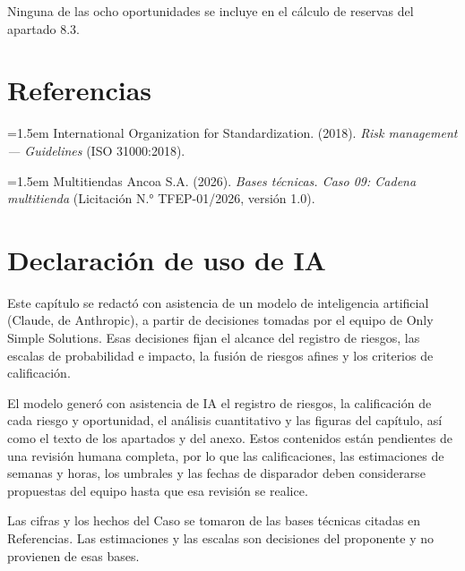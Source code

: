 \documentclass[11pt]{article}
\begin{document}
Ninguna de las ocho oportunidades se incluye en el cálculo de reservas del apartado 8.3.

\section*{Referencias}

\noindent\hangindent=1.5em International Organization for Standardization. (2018). \textit{Risk management — Guidelines} (ISO 31000:2018).

\noindent\hangindent=1.5em Multitiendas Ancoa S.A. (2026). \textit{Bases técnicas. Caso 09: Cadena multitienda} (Licitación N.° TFEP-01/2026, versión 1.0).

\section*{Declaración de uso de IA}

Este capítulo se redactó con asistencia de un modelo de inteligencia artificial (Claude, de Anthropic), a partir de decisiones tomadas por el equipo de Only Simple Solutions. Esas decisiones fijan el alcance del registro de riesgos, las escalas de probabilidad e impacto, la fusión de riesgos afines y los criterios de calificación.

El modelo generó con asistencia de IA el registro de riesgos, la calificación de cada riesgo y oportunidad, el análisis cuantitativo y las figuras del capítulo, así como el texto de los apartados y del anexo. Estos contenidos están pendientes de una revisión humana completa, por lo que las calificaciones, las estimaciones de semanas y horas, los umbrales y las fechas de disparador deben considerarse propuestas del equipo hasta que esa revisión se realice.

Las cifras y los hechos del Caso se tomaron de las bases técnicas citadas en Referencias. Las estimaciones y las escalas son decisiones del proponente y no provienen de esas bases.

\ossFinalPage
\end{document}
